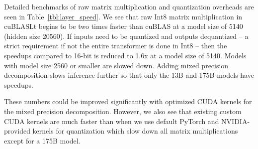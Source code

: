 \documentclass{article}
\begin{document}
Detailed benchmarks of raw matrix multiplication and quantization overheads are seen in Table~\ref{tbl:layer_speed}. We see that raw Int8 matrix multiplication in cuBLASLt begins to be two times faster than cuBLAS at a model size of 5140 (hidden size 20560). If inputs need to be quantized and outputs dequantized -- a strict requirement if not the entire transformer is done in Int8 -- then the speedups compared to 16-bit is reduced to 1.6x at a model size of 5140. Models with model size 2560 or smaller are slowed down. Adding mixed precision decomposition slows inference further so that only the 13B and 175B models have speedups.

These numbers could be improved significantly with optimized CUDA kernels for the mixed precision decomposition. However, we also see that existing custom CUDA kernels are much faster than when we use default PyTorch and NVIDIA-provided kernels for quantization which slow down all matrix multiplications except for a 175B model.

\begin{table}[h]
\centering
\caption{Inference speedups compared to 16-bit matrix multiplication for the first hidden layer in the feed-forward of differently sized GPT-3 transformers. The hidden dimension is 4x the model dimension. The 8-bit without overhead speedups assumes that no quantization or dequantization is performed. Numbers small than 1.0x represent slowdowns. Int8 matrix multiplication speeds up inference only for models with large model and hidden dimensions. }
\label{tbl:layer_speed}
\end{table}
\end{document}

